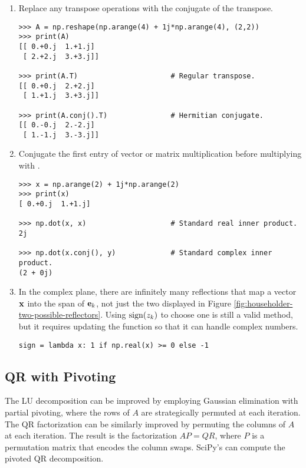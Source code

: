\begin{enumerate}

\item Replace any transpose operations with the conjugate of the transpose.

\begin{lstlisting}
>>> A = np.reshape(np.arange(4) + 1j*np.arange(4), (2,2))
>>> print(A)
[[ 0.+0.j  1.+1.j]
 [ 2.+2.j  3.+3.j]]

>>> print(A.T)                      # Regular transpose.
[[ 0.+0.j  2.+2.j]
 [ 1.+1.j  3.+3.j]]

>>> print(A.conj().T)               # Hermitian conjugate.
[[ 0.-0.j  2.-2.j]
 [ 1.-1.j  3.-3.j]]
\end{lstlisting}

\item Conjugate the first entry of vector or matrix multiplication before multiplying with .

\begin{lstlisting}
>>> x = np.arange(2) + 1j*np.arange(2)
>>> print(x)
[ 0.+0.j  1.+1.j]

>>> np.dot(x, x)                    # Standard real inner product.
2j

>>> np.dot(x.conj(), y)             # Standard complex inner product.
(2 + 0j)
\end{lstlisting}

\item In the complex plane, there are infinitely many reflections that map a vector $\mathbf{x}$ into the span of $\mathbf{e}_k$, not just the two displayed in Figure \ref{fig:householder-two-possible-reflectors}.
Using $\operatorname{sign}(z_k)$ to choose one is still a valid method, but it requires updating the  function so that it can handle complex numbers.

\begin{lstlisting}
sign = lambda x: 1 if np.real(x) >= 0 else -1
\end{lstlisting}

\end{enumerate}

\subsection*{QR with Pivoting} %

The LU decomposition can be improved by employing Gaussian elimination with partial pivoting, where the rows of $A$ are strategically permuted at each iteration.
The QR factorization can be similarly improved by permuting the columns of $A$ at each iteration.
The result is the factorization $AP = QR$, where $P$ is a permutation matrix that encodes the column swaps.
SciPy's  can compute the pivoted QR decomposition.

